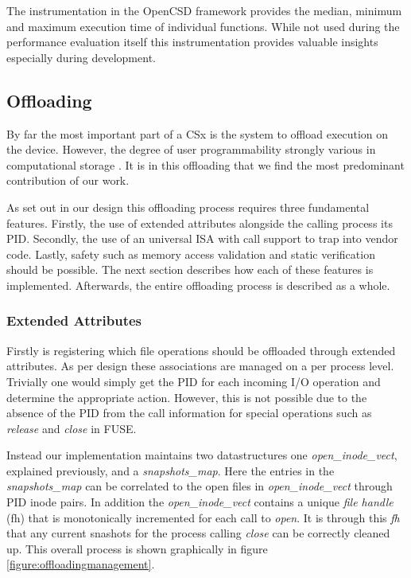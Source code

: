 The instrumentation in the OpenCSD framework provides the median, minimum and
maximum execution time of individual functions. While not used during the
performance evaluation itself this instrumentation provides valuable insights
especially during development.

\subsection{Offloading}

By far the most important part of a CSx is the system to offload execution on
the device. However, the degree of user programmability strongly various in
computational storage \cite{lukken2021past}. It is in this offloading that we
find the most predominant contribution of our work.

As set out in our design this offloading process requires three fundamental
features. Firstly, the use of extended attributes alongside the calling process
its PID. Secondly, the use of an universal ISA with call support to trap
into vendor code. Lastly, safety such as memory access validation and static
verification should be possible. The next section describes how each of these
features is implemented. Afterwards, the entire offloading process is described
as a whole.

\subsubsection{Extended Attributes}

Firstly is registering which file operations should be offloaded through
extended attributes. As per design these associations are managed on a per
process level. Trivially one would simply get the PID for each incoming I/O
operation and determine the appropriate action. However, this is not
possible due to the absence of the PID from the call information for special
operations such as \textit{release} and \textit{close} in FUSE. 

Instead our implementation maintains two datastructures one 
\textit{open\_inode\_vect}, explained previously, and a \textit{snapshots\_map}.
Here the entries in the \textit{snapshots\_map} can be correlated to the open
files in \textit{open\_inode\_vect} through PID inode pairs. In addition the
\textit{open\_inode\_vect} contains a unique \textit{file handle} (fh) that is
monotonically incremented for each call to \textit{open}. It is through this
\textit{fh} that any current snashots for the process calling \textit{close}
can be correctly cleaned up. This overall process is shown graphically in
figure \ref{figure:offloadingmanagement}.

